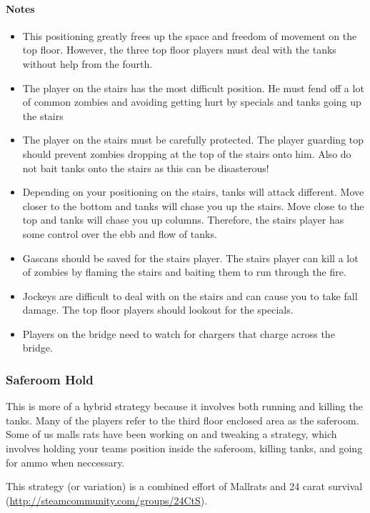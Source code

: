 \paragraph{Notes}
\begin{itemize}
\item This positioning greatly frees up the space and freedom of movement on the top floor. However, the three top floor players must deal with the tanks without help from the fourth.
\item The player on the stairs has the most difficult position. He must fend off a lot of common zombies and avoiding getting hurt by specials and tanks going up the stairs
\item The player on the stairs must be carefully protected. The player guarding top should prevent zombies dropping at the top of the stairs onto him. Also do not bait tanks onto the stairs as this can be disasterous!
\item Depending on your positioning on the stairs, tanks will attack different. Move closer to the bottom and tanks will chase you up the stairs. Move close to the top and tanks will chase you up columns. Therefore, the stairs player has some control over the ebb and flow of tanks.
\item Gascans should be saved for the stairs player. The stairs player can kill a lot of zombies by flaming the stairs and baiting them to run through the fire.
\item Jockeys are difficult to deal with on the stairs and can cause you to take fall damage. The top floor players should lookout for the specials.
\item Players on the bridge need to watch for chargers that charge across the bridge.
\end{itemize}

\subsubsection{Saferoom Hold}
This is more of a hybrid strategy because it involves both running and killing the tanks. Many of the players refer to the third floor enclosed area as the saferoom. Some of us malls rats have been working on and tweaking a strategy, which involves holding your teams position inside the saferoom, killing tanks, and going for ammo when neccessary.

This strategy (or variation) is a combined effort of Mallrats and 24 carat survival
(\url{http://steamcommunity.com/groups/24CtS}).

